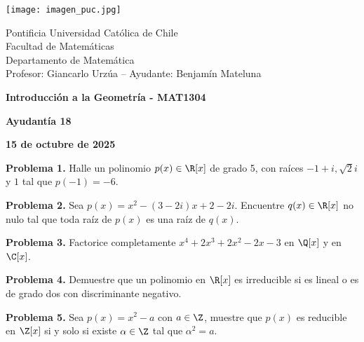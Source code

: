 \documentclass{article}
\begin{document}
\begin{minipage}{2.5cm}
    \texttt{[image: imagen\_puc.jpg]}
\end{minipage}
\begin{minipage}{14cm}
    {\sc Pontificia Universidad Católica de Chile\\
    Facultad de Matemáticas\\
    Departamento de Matemática\\
    Profesor: Giancarlo Urzúa -- Ayudante: Benjamín Mateluna}
\end{minipage}
\vspace{1ex}

{\centerline{\bf Introducción a la Geometría - MAT1304}
\centerline{\bf Ayudantía 18}}
\centerline{\bf 15 de octubre de 2025}

\vspace{1cm}

\vspace{5mm}
\noindent\textbf{Problema 1.} Halle un polinomio $p(x)\in\R[x]$ de grado 5, con raíces $-1+i,
\sqrt{2}i$ y $1$ tal que $p(-1)=-6$.

\vspace{5mm}
\noindent\textbf{Problema 2.} Sea $p(x)=x^{2}-(3-2i)x+2-2i$. Encuentre $q(x)\in\R[x]$ no nulo
tal que toda raíz de $p(x)$ es una raíz de $q(x)$.

\vspace{5mm}
\noindent\textbf{Problema 3.} Factorice completamente $x^{4}+2x^{3}+2x^{2}-2x-3$ en $\Q[x]$ y en 
$\C[x]$.

\vspace{5mm}
\noindent\textbf{Problema 4.} Demuestre que un polinomio en $\R[x]$ es irreducible si es lineal o 
es de grado dos con discriminante negativo.

\vspace{5mm}
\noindent\textbf{Problema 5.} Sea $p(x)=x^{2}-a$ con $a\in\Z$, muestre que $p(x)$ es reducible 
en $\Z[x]$ si y solo si existe $\alpha\in\Z$ tal que $\alpha^{2}=a$.

\end{document}
